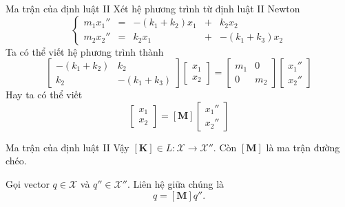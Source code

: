 \begin{frame}{Ma trận của định luật II}
Xét hệ phương trình từ định luật II Newton
    \begin{equation*}
    \left\{
    \begin{array}{cccccc}
    m_1 x_1'' &=& - (k_1+k_2) x_1 &+& k_2 x_2 \\
    m_2 x_2'' &=&  k_2 x_1 &+& -(k_1+ k_3) x_2
    \end{array}
    \right.
    \end{equation*}
Ta có thể viết hệ phương trình thành
\begin{equation}
    \left[
    \begin{array}{cc}
    -(k_1+k_2) & k_2 \\
    k_2 & -(k_1+ k_3)
    \end{array}
    \right] 
    \left[
    \begin{array}{c}
    x_1 \\
    x_2
    \end{array}
    \right] =  
    \left[
    \begin{array}{cc}
    m_1 & 0 \\
    0 & m_2 
    \end{array}
    \right] 
    \left[
    \begin{array}{c}
    x_1'' \\
    x_2''
    \end{array}
    \right]
\end{equation}
Hay ta có thể viết
\begin{equation}
    [\mathbf{K}] 
    \left[
    \begin{array}{c}
    x_1 \\
    x_2
    \end{array}
    \right]= [\mathbf{M}] 
    \left[
    \begin{array}{c}
    x_1'' \\
    x_2''
    \end{array}
    \right]
\end{equation}
\end{frame}

\begin{frame}{Ma trận của định luật II}
    Vậy \([\mathbf{K}] \in L : \mathcal{X} \rightarrow \mathcal{X}''\). Còn \([\mathbf{M}]\) là ma trận đường chéo. 
    \vspace{2mm}

    Gọi vector \(q \in \mathcal{X}\) và \(q'' \in \mathcal{X}''\). Liên hệ giữa chúng là
    \begin{equation}
        [\mathbf{K}] q = [\mathbf{M}] q''.
    \end{equation}
\end{frame}